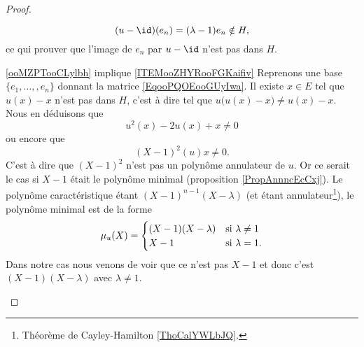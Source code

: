\begin{proof}
\begin{subproof}
        \begin{equation}
            (u-\id)(e_n)=(\lambda-1)e_n\notin H,
        \end{equation}
        ce qui prouver que l'image de \( e_n\) par \( u-\id\) n'est pas dans \( H\).
    \item[\ref{ooMZPTooCLylbh} implique \ref{ITEMooZHYRooFGKaifiv}]
        Reprenons une base \( \{ e_1,\ldots, ,e_n \}\) donnant la matrice \eqref{EqooPQOEooGUyIwa}. Il existe \( x\in E\) tel que \( u(x)-x\) n'est pas dans \( H\), c'est à dire tel que \( u\big( u(x)-x \big)\neq u(x)-x\). Nous en déduisons que
        \begin{equation}
            u^2(x)-2u(x)+x\neq 0
        \end{equation}
        ou encore que 
        \begin{equation}
            (X-1)^2(u)x\neq 0.
        \end{equation}
        C'est à dire que \( (X-1)^2\) n'est pas un polynôme annulateur de \( u\). Or ce serait le cas si \( X-1\) était le polynôme minimal (proposition \ref{PropAnnncEcCxj}). Le polynôme caractéristique étant \( (X-1)^{n-1}(X-\lambda)\) (et étant annulateur\footnote{Théorème de Cayley-Hamilton \ref{ThoCalYWLbJQ}.}), le polynôme minimal est de la forme 
        \begin{equation}
            \mu_u(X)=\begin{cases}
                (X-1)(X-\lambda)    &   \text{si \( \lambda\neq 1\)}\\
                X-1    &    \text{si \( \lambda=1\)}.
            \end{cases}
        \end{equation}
        Dans notre cas nous venons de voir que ce n'est pas \( X-1\) et donc c'est \( (X-1)(X-\lambda)\) avec \( \lambda\neq 1\).


\end{subproof}
\end{proof}
